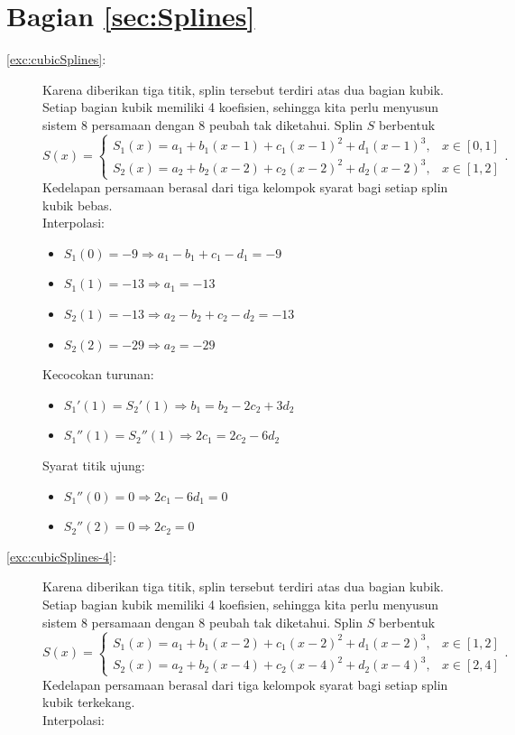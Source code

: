\section*{Bagian \ref{sec:Splines}}
\begin{description}
\item [{\ref{exc:cubicSplines}:}] Karena diberikan tiga titik, splin tersebut
terdiri atas dua bagian kubik. Setiap bagian kubik memiliki 4 koefisien,
sehingga kita perlu menyusun sistem 8 persamaan dengan 8 peubah tak
diketahui. Splin $S$ berbentuk
\[
S(x)=\begin{cases}
S_{1}(x)=a_{1}+b_{1}(x-1)+c_{1}(x-1)^{2}+d_{1}(x-1)^{3}, & x\in[0,1]\\
S_{2}(x)=a_{2}+b_{2}(x-2)+c_{2}(x-2)^{2}+d_{2}(x-2)^{3}, & x\in[1,2]
\end{cases}.
\]
Kedelapan persamaan berasal dari tiga kelompok syarat bagi setiap
splin kubik bebas.\\
Interpolasi:

\begin{itemize}
\item $S_{1}(0)=-9\Rightarrow a_{1}-b_{1}+c_{1}-d_{1}=-9$
\item $S_{1}(1)=-13\Rightarrow a_{1}=-13$
\item $S_{2}(1)=-13\Rightarrow a_{2}-b_{2}+c_{2}-d_{2}=-13$
\item $S_{2}(2)=-29\Rightarrow a_{2}=-29$
\end{itemize}
Kecocokan turunan:
\begin{itemize}
\item $S_{1}'(1)=S_{2}'(1)\Rightarrow b_{1}=b_{2}-2c_{2}+3d_{2}$
\item $S_{1}''(1)=S_{2}''(1)\Rightarrow2c_{1}=2c_{2}-6d_{2}$
\end{itemize}
Syarat titik ujung:
\begin{itemize}
\item $S_{1}''(0)=0\Rightarrow2c_{1}-6d_{1}=0$
\item $S_{2}''(2)=0\Rightarrow2c_{2}=0$
\end{itemize}
\item [{\ref{exc:cubicSplines-4}:}] Karena diberikan tiga titik, splin
tersebut terdiri atas dua bagian kubik. Setiap bagian kubik memiliki
4 koefisien, sehingga kita perlu menyusun sistem 8 persamaan dengan
8 peubah tak diketahui. Splin $S$ berbentuk
\[
S(x)=\begin{cases}
S_{1}(x)=a_{1}+b_{1}(x-2)+c_{1}(x-2)^{2}+d_{1}(x-2)^{3}, & x\in[1,2]\\
S_{2}(x)=a_{2}+b_{2}(x-4)+c_{2}(x-4)^{2}+d_{2}(x-4)^{3}, & x\in[2,4]
\end{cases}.
\]
Kedelapan persamaan berasal dari tiga kelompok syarat bagi setiap
splin kubik terkekang.\\
Interpolasi:


\end{description}
